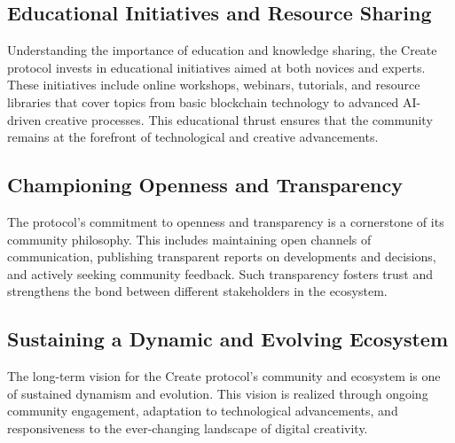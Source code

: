 \documentclass[12pt,a4paper]{article}
\begin{document}
\subsection{Educational Initiatives and Resource Sharing}

Understanding the importance of education and knowledge sharing, the Create protocol invests in educational initiatives aimed at both novices and experts. These initiatives include online workshops, webinars, tutorials, and resource libraries that cover topics from basic blockchain technology to advanced AI-driven creative processes. This educational thrust ensures that the community remains at the forefront of technological and creative advancements.

\subsection{Championing Openness and Transparency}

The protocol’s commitment to openness and transparency is a cornerstone of its community philosophy. This includes maintaining open channels of communication, publishing transparent reports on developments and decisions, and actively seeking community feedback. Such transparency fosters trust and strengthens the bond between different stakeholders in the ecosystem.

\subsection{Sustaining a Dynamic and Evolving Ecosystem}

The long-term vision for the Create protocol’s community and ecosystem is one of sustained dynamism and evolution. This vision is realized through ongoing community engagement, adaptation to technological advancements, and responsiveness to the ever-changing landscape of digital creativity.

\noindent{}
\end{document}
